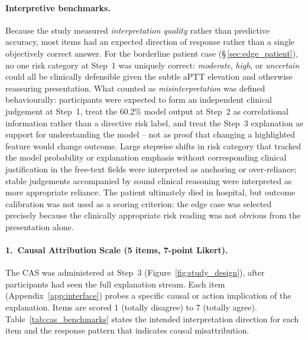 \documentclass[12pt, a4paper]{article}
\begin{document}
\paragraph*{Interpretive benchmarks.}
Because the study measured \emph{interpretation quality} rather than
predictive accuracy, most items had an expected direction of response
rather than a single objectively correct answer. For the borderline
patient case (\S\,\ref{sec:edge_patient}), no one risk category at
Step~1 was uniquely correct: \emph{moderate}, \emph{high}, or
\emph{uncertain} could all be clinically defensible given the subtle
aPTT elevation and otherwise reassuring presentation. What counted as
\emph{misinterpretation} was defined behaviourally: participants were
expected to form an independent clinical judgement at Step~1, treat the
60.2\% model output at Step~2 as correlational information rather than
a directive risk label, and treat the Step~3 explanation as support for
understanding the model -- not as proof that changing a highlighted
feature would change outcome. Large stepwise shifts in risk category
that tracked the model probability or explanation emphasis without
corresponding clinical justification in the free-text fields were
interpreted as anchoring or over-reliance; stable judgements
accompanied by sound clinical reasoning were interpreted as more
appropriate reliance. The patient ultimately died in hospital, but
outcome calibration was not used as a scoring criterion: the edge case
was selected precisely because the clinically appropriate risk reading
was not obvious from the presentation alone.

\paragraph*{1.\ Causal Attribution Scale (5 items, 7-point Likert).}
The CAS was administered at Step~3 (Figure~\ref{fig:study_design}),
after participants had seen the full explanation stream. Each item
(Appendix~\ref{app:interface}) probes a specific causal or action
implication of the explanation. Items are scored 1 (totally
disagree) to 7 (totally agree). Table~\ref{tab:cas_benchmarks} states
the intended interpretation direction for each item and the response
pattern that indicates causal misattribution.
\end{document}
